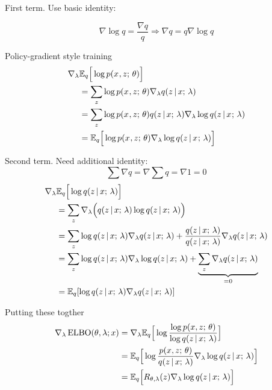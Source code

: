 \begin{frame}
First term. Use basic identity:

\[\nabla \log q = \frac{\nabla q}{q} \Rightarrow \nabla q  = q \nabla \log q \]

Policy-gradient style training \citep{Williams1992}
\begin{align*}
    \nabla_\lambda & \mathbb{E}_{q}\Big[\log p(x^{}, z ; \, \theta) \Big] \\
    &=  \sum_z  \log p(x^{}, z ; \, \theta) \nabla_\lambda   q(z \,|\, x ; \, \lambda )  \\
        &=  \sum_z  \log p(x^{}, z ; \, \theta)  q(z \,|\, x ; \, \lambda )  \nabla_\lambda \log q(z \,|\, x^{} ; \, \lambda)  \\
    &= \mathbb{E}_{q}\Big[ \log p(x^{}, z ; \, \theta) \nabla_\lambda \log q(z \,|\, x^{} ; \, \lambda) \Big]
\end{align*}
\end{frame}

\begin{frame}
Second term. Need additional identity:
\[\sum \nabla q = \nabla \sum q = \nabla 1 = 0 \]
\vspace{-5mm}
\begin{align*}
    \nabla_\lambda & \mathbb{E}_{q}\Big[\log q(z \,|\, x ; \, \lambda) \Big] \\
    &= \sum_{z} \nabla_\lambda \Big ( q(z \,|\, x; \, \lambda) \log q(z \,|\, x ; \, \lambda)\Big) \\
    &= \sum_{z}  \log q(z \,|\, x ; \, \lambda) \nabla_\lambda q(z \,|\, x ; \, \lambda) +  \frac{q(z \,|\, x ; \, \lambda)}{q(z \,|\, x ; \, \lambda)}\nabla_\lambda q(z \,|\, x ; \, \lambda)\\
    &= \sum_{z}  \log q(z \,|\, x ; \, \lambda) \nabla_\lambda \log q(z \,|\, x ; \, \lambda) + \underbrace{\sum_z \nabla_\lambda q(z \,|\, x ; \, \lambda)}_{= 0} \\
    &= \mathbb{E}_{q}[\log q (z \,|\, x ; \, \lambda) \nabla_\lambda q (z \,|\, x ; \, \lambda)]
\end{align*}
\end{frame}

\begin{frame}
Putting these togther
\begin{align*}
       \nabla_\lambda \operatorname*{ELBO}(\theta, \lambda ; x) &=  \nabla_\lambda \mathbb{E}_q \Big[\log \frac{\log p(x, z ; \, \theta)}{\log q (z \,|\, x ; \, \lambda)} \Big]\\
       &= \mathbb{E}_q \Big[\log \frac{p(x, z ; \, \theta)}{q(z \,|\, x ; \, \lambda)} \nabla_\lambda \log q ( z \,|\, x ; \, \lambda ) \Big] \\
       &= \mathbb{E}_q \Big[R_{\theta, \lambda}(z) \nabla_\lambda \log q ( z \,|\, x ; \, \lambda ) \Big]
\end{align*}
\end{frame}

